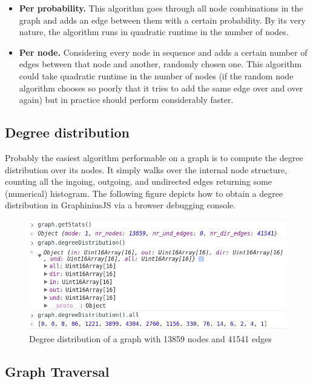 	\begin{itemize}
		\item \textbf{Per probability.} This algorithm goes through all node combinations in the graph and adds an edge between them with a certain probability. By its very nature, the algorithm runs in quadratic runtime in the number of nodes.
		\item \textbf{Per node.} Considering every node in sequence and adds a certain number of edges between that node and another, randomly chosen one. This algorithm could take quadratic runtime in the number of nodes (if the random node algorithm chooses so poorly that it tries to add the same edge over and over again) but in practice should perform considerably faster.
	\end{itemize}
	
	
	\subsection{Degree distribution}
	\label{ssection: core_degrees}
	
	Probably the easiest algorithm performable on a graph is to compute the degree distribution over its nodes. It simply walks over the internal node structure, counting all the ingoing, outgoing, and undirected edges returning some (numerical) histogram. The following figure depicts how to obtain a degree distribution in GraphiniusJS via a browser debugging console.
	
	\begin{figure}[H]
		\centering
		\hspace*{-0.5cm}
		\includegraphics[width=1\textwidth]{figures/deg_dist}
		\caption{Degree distribution of a graph with 13859 nodes and 41541 edges }
		\label{fig:graphinius_architecture}
	\end{figure}
	
	
	\subsection{Graph Traversal}
	\label{ssect:search_bfs}
	
